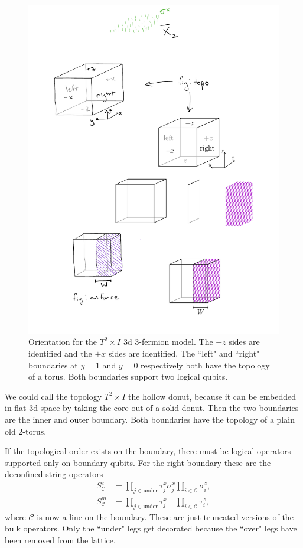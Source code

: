 \documentclass[twocolumn, longbibliography]{revtex4-2}
\newcommand{\C}{\mathcal{C}}
\begin{document}
\begin{figure}
\centering
\includegraphics{topo}
\caption{Orientation for the $T^2\times I$ 3d 3-fermion model. The $\pm z$ sides are identified and the $\pm x$ sides are identified. The ``left" and ``right" boundaries at $y=1$ and $y=0$ respectively both have the topology of a torus. Both boundaries support two logical qubits.}
\label{fig:topo}
\end{figure}

We could call the topology $T^2\times I$ the hollow donut, because it can be embedded in flat 3d space by taking the core out of a solid donut. Then the two boundaries are the inner and outer boundary. Both boundaries have the topology of a plain old 2-torus.

If the topological order exists on the boundary, there must be logical operators supported only on boundary qubits. For the right boundary these are the deconfined string operators
\begin{align}
S^e_\C &= \prod_{j\in \text{under}}\tau_j^x \sigma_j^x \prod_{i\in\mathcal{C}} \sigma_i^z,\\
S^m_\C &= \prod_{j\in \text{under}}\tau_j^x\phantom{ \sigma_j^x} \prod_{i\in\mathcal{C}} \tau_i^z,
\end{align}
where $\mathcal{C}$ is now a line on the boundary. These are just truncated versions of the bulk operators. Only the ``under" legs get decorated because the ``over" legs have been removed from the lattice.
\end{document}
